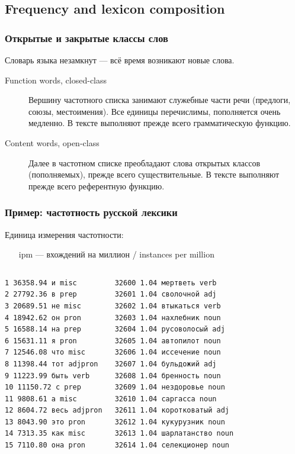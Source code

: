 \documentclass[svgnames]{beamer}
\begin{document}
\subsection{Frequency and lexicon composition}

  \begin{frame}
    \frametitle{Открытые и закрытые классы слов}
      Словарь языка незамкнут — всё время возникают новые слова.
    \begin{description}
    \item[Function words, closed-class] 
      Вершину частотного списка занимают служебные части речи
      (\alert{предлоги, союзы, местоимения}). Все единицы перечислимы,
      пополняется очень медленно. В тексте выполняют прежде всего
      грамматическую функцию. 
    \item[Content words, open-class]
      Далее в частотном списке преобладают слова открытых классов (пополняемых), прежде
      всего \alert{существительные}. В тексте выполняют прежде всего
      референтную функцию.
    \end{description}
  \end{frame}


\begin{frame}[fragile]
  \frametitle{Пример: частотность русской лексики}
  Единица измерения частотности:
  \begin{itemize}
  \item[ipm] — вхождений на миллион / instances per million 
  \end{itemize}
  \small
  \begin{columns}
    
\begin{verbatim}
1 36358.94 и misc 
2 27792.36 в prep 
3 20689.51 не misc 
4 18942.62 он pron 
5 16588.14 на prep 
6 15631.11 я pron 
7 12546.08 что misc 
8 11398.44 тот adjpron
9 11223.99 быть verb 
10 11150.72 с prep 
11 9808.61 а misc 
12 8604.72 весь adjpron
13 8043.90 это pron 
14 7313.35 как misc 
15 7110.80 она pron 
\end{verbatim}
\begin{verbatim}
32600 1.04 мертветь verb
32601 1.04 сволочной adj
32602 1.04 втыкаться verb
32603 1.04 нахлебник noun
32604 1.04 русоволосый adj
32605 1.04 автопилот noun
32606 1.04 иссечение noun
32607 1.04 бульдожий adj
32608 1.04 бренность noun
32609 1.04 нездоровье noun
32610 1.04 саргасса noun
32611 1.04 коротковатый adj
32612 1.04 кукурузник noun
32613 1.04 шарлатанство noun
32614 1.04 селекционер noun
\end{verbatim}
  \end{columns}
\end{frame}
  
\end{document}
